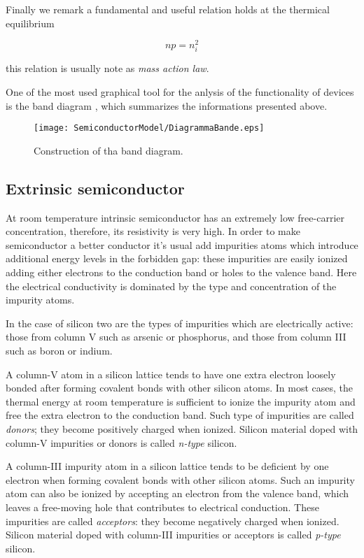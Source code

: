Finally we remark a fundamental and useful relation holds at the thermical equilibrium

\begin{equation}
\label{eq: legge di azione di massa}
np=n_i^2
\end{equation}

this relation is usually note as \textit{mass action law}.

One of the most used graphical tool for the anlysis of the functionality of devices is the band diagram , which summarizes the informations presented above.
\begin{figure}[!h]
\centering
\texttt{[image: SemiconductorModel/DiagrammaBande.eps]}
\caption{Construction of tha band diagram.}
\label{fig: band diagram}
\end{figure}

\subsection{Extrinsic semiconductor}
At room temperature intrinsic semiconductor has an extremely low free-carrier concentration, therefore, its resistivity is very high. In order to make semiconductor a better conductor it's usual add impurities atoms which introduce additional energy levels in the forbidden gap: these impurities are easily ionized adding either electrons to the conduction band or holes to the valence band. Here the electrical conductivity is dominated by the type and concentration of the impurity atoms.

In the case of silicon two are the types of impurities which are electrically active: those from column V such as arsenic or phosphorus, and those from column III such as boron or indium.

A column-V atom in a silicon lattice tends to have one extra electron loosely bonded after forming covalent bonds with other silicon atoms. In most cases, the thermal energy at room temperature is sufficient to ionize the impurity atom and free the extra electron to the conduction band. Such type of impurities are called \textit{donors}; they become positively charged when ionized. Silicon material doped with column-V impurities or donors is called \textit{n-type} silicon.

A column-III impurity atom in a silicon lattice tends to be deficient by one electron when forming covalent bonds with other silicon atoms. Such an impurity atom can also be ionized by accepting an electron from the valence band, which leaves a free-moving hole that contributes to electrical conduction. These impurities are called \textit{acceptors}: they become negatively charged when ionized. Silicon material doped with column-III impurities or acceptors is called \textit{p-type} silicon.

